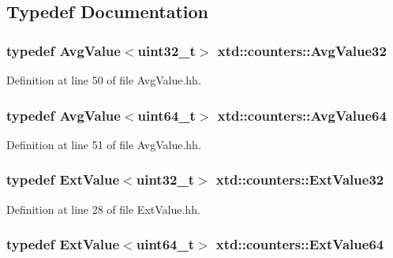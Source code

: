 \subsection{Typedef Documentation}
\hypertarget{namespacextd_1_1counters_a162dd5cde0e6fcc970c543f7420b4c14}{
\subsubsection[{Avg\-Value32}]{\setlength{\rightskip}{0pt plus 5cm}typedef {\bf Avg\-Value}$<$uint32\-\_\-t$>$ {\bf xtd\-::counters\-::\-Avg\-Value32}}}\label{namespacextd_1_1counters_a162dd5cde0e6fcc970c543f7420b4c14}


Definition at line 50 of file Avg\-Value.\-hh.

\hypertarget{namespacextd_1_1counters_aa43118623f65cdf1ba43bffd8f17ea0e}{
\subsubsection[{Avg\-Value64}]{\setlength{\rightskip}{0pt plus 5cm}typedef {\bf Avg\-Value}$<$uint64\-\_\-t$>$ {\bf xtd\-::counters\-::\-Avg\-Value64}}}\label{namespacextd_1_1counters_aa43118623f65cdf1ba43bffd8f17ea0e}


Definition at line 51 of file Avg\-Value.\-hh.

\hypertarget{namespacextd_1_1counters_ae049cff0f00adb1728a511d333c2aa50}{
\subsubsection[{Ext\-Value32}]{\setlength{\rightskip}{0pt plus 5cm}typedef {\bf Ext\-Value}$<$uint32\-\_\-t$>$ {\bf xtd\-::counters\-::\-Ext\-Value32}}}\label{namespacextd_1_1counters_ae049cff0f00adb1728a511d333c2aa50}


Definition at line 28 of file Ext\-Value.\-hh.

\hypertarget{namespacextd_1_1counters_ad0d26d26ad71069f92a20b6d870e4872}{
\subsubsection[{Ext\-Value64}]{\setlength{\rightskip}{0pt plus 5cm}typedef {\bf Ext\-Value}$<$uint64\-\_\-t$>$ {\bf xtd\-::counters\-::\-Ext\-Value64}}}\label{namespacextd_1_1counters_ad0d26d26ad71069f92a20b6d870e4872}


